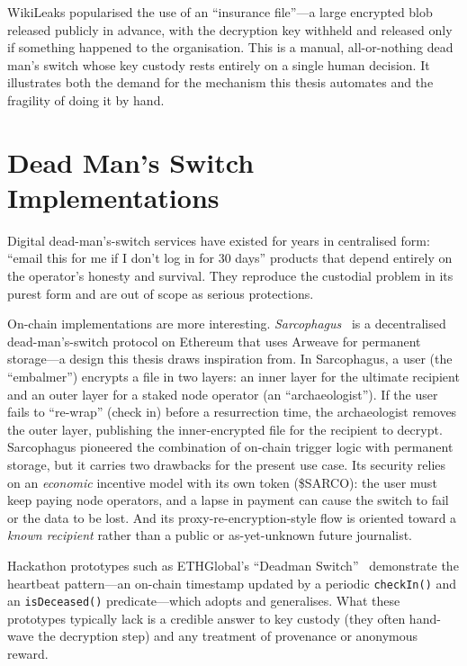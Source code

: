 WikiLeaks popularised the use of an ``insurance file''---a large encrypted blob
released publicly in advance, with the decryption key withheld and released only
if something happened to the organisation. This is a manual, all-or-nothing dead
man's switch whose key custody rests entirely on a single human decision. It
illustrates both the demand for the mechanism this thesis automates and the
fragility of doing it by hand.

\section{Dead Man's Switch Implementations}
\label{sec:rel-dms}

Digital dead-man's-switch services have existed for years in centralised form:
``email this for me if I don't log in for 30 days'' products that depend entirely
on the operator's honesty and survival. They reproduce the custodial problem in
its purest form and are out of scope as serious protections.

On-chain implementations are more interesting. \emph{Sarcophagus}~\cite{sarcophagus}
is a decentralised dead-man's-switch protocol on Ethereum that uses Arweave for
permanent storage---a design this thesis draws inspiration from. In Sarcophagus, a
user (the ``embalmer'') encrypts a file in two layers: an inner layer for the
ultimate recipient and an outer layer for a staked node operator (an
``archaeologist''). If the user fails to ``re-wrap'' (check in) before a
resurrection time, the archaeologist removes the outer layer, publishing the
inner-encrypted file for the recipient to decrypt. Sarcophagus pioneered the
combination of on-chain trigger logic with permanent storage, but it carries two
drawbacks for the present use case. Its security relies on an \emph{economic}
incentive model with its own token (\$SARCO): the user must keep paying node
operators, and a lapse in payment can cause the switch to fail or the data to be
lost. And its proxy-re-encryption-style flow is oriented toward a \emph{known
recipient} rather than a public or as-yet-unknown future journalist.

Hackathon prototypes such as ETHGlobal's ``Deadman Switch''~\cite{ethglobalDeadman}
demonstrate the heartbeat pattern---an on-chain timestamp updated by a periodic
\texttt{checkIn()} and an \texttt{isDeceased()} predicate---which \zkw adopts and
generalises. What these prototypes typically lack is a credible answer to key
custody (they often hand-wave the decryption step) and any treatment of
provenance or anonymous reward.

